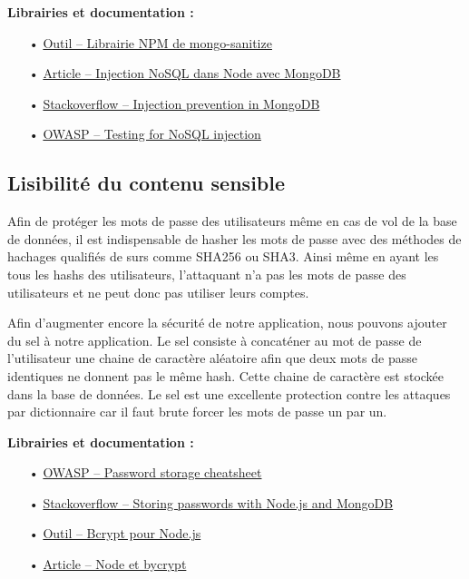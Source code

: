\documentclass[12pt]{article}
\begin{document}
\medskip
\textbf{Librairies et documentation :}

\begin{itemize}
\item[•] \href{https://www.npmjs.com/package/mongo-sanitize}{Outil -- Librairie NPM de mongo-sanitize}
\item[•] \href{https://zanon.io/posts/nosql-injection-in-mongodb}{Article -- Injection NoSQL dans Node avec MongoDB}
\item[•] \href{https://stackoverflow.com/questions/13436467/javascript-nosql-injection-prevention-in-mongodb}{Stackoverflow -- Injection prevention in MongoDB}
\item[•] \href{https://www.owasp.org/index.php/Testing_for_NoSQL_injection}{OWASP -- Testing for NoSQL injection}
\end{itemize}

\subsection{Lisibilité du contenu sensible}
\label{ssec:cm-hash}

Afin de protéger les mots de passe des utilisateurs même en cas de vol de la base de données, il est indispensable de hasher les mots de passe avec des méthodes de hachages qualifiés de surs comme SHA256 ou SHA3. Ainsi même en ayant les tous les hashs des utilisateurs, l'attaquant n'a pas les mots de passe des utilisateurs et ne peut donc pas utiliser leurs comptes. 

Afin d'augmenter encore la sécurité de notre application, nous pouvons ajouter du sel à notre application. Le sel consiste à concaténer au mot de passe de l'utilisateur une chaine de caractère aléatoire afin que deux mots de passe identiques ne donnent pas le même hash. Cette chaine de caractère est stockée dans la base de données. Le sel est une excellente protection contre les attaques par dictionnaire car il faut brute forcer les mots de passe un par un.
\clearpage

\medskip
\textbf{Librairies et documentation :}

\begin{itemize}
\item[•] \href{https://www.owasp.org/index.php/Password_Storage_Cheat_Sheet}{OWASP -- Password storage cheatsheet}
\item[•] \href{https://stackoverflow.com/questions/6951563/storing-passwords-with-node-js-and-mongodb}{Stackoverflow -- Storing passwords with Node.js and MongoDB}
\item[•] \href{https://github.com/kelektiv/node.bcrypt.js}{Outil -- Bcrypt pour Node.js}
\item[•] \href{https://www.abeautifulsite.net/hashing-passwords-with-nodejs-and-bcrypt}{Article -- Node et bycrypt}
\end{itemize}
 
\end{document}

